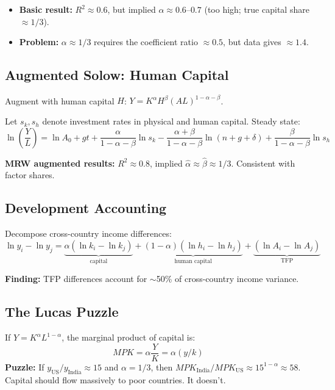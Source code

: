 \documentclass[a4paper,11pt]{article}
\begin{document}
\begin{itemize}
    \item \textbf{Basic result:} $R^2 \approx 0.6$, but implied $\alpha \approx 0.6$--$0.7$ (too high; true capital share $\approx 1/3$).
    \item \textbf{Problem:} $\alpha \approx 1/3$ requires the coefficient ratio $\approx 0.5$, but data gives $\approx 1.4$.
\end{itemize}

\subsection*{Augmented Solow: Human Capital}

Augment with human capital $H$: $Y = K^\alpha H^\beta (AL)^{1-\alpha-\beta}$.

Let $s_k, s_h$ denote investment rates in physical and human capital. Steady state:
\[
\ln\!\left(\frac{Y}{L}\right) = \ln A_0 + gt + \frac{\alpha}{1-\alpha-\beta}\ln s_k - \frac{\alpha+\beta}{1-\alpha-\beta}\ln(n+g+\delta) + \frac{\beta}{1-\alpha-\beta}\ln s_h
\]

\begin{resultbox}
\textbf{MRW augmented results:} $R^2 \approx 0.8$, implied $\hat{\alpha} \approx \hat{\beta} \approx 1/3$. Consistent with factor shares.
\end{resultbox}

\subsection*{Development Accounting}

Decompose cross-country income differences:
\[
\ln y_i - \ln y_j = \underbrace{\alpha(\ln k_i - \ln k_j)}_{\text{capital}} + \underbrace{(1-\alpha)(\ln h_i - \ln h_j)}_{\text{human capital}} + \underbrace{(\ln A_i - \ln A_j)}_{\text{TFP}}
\]

\textbf{Finding:} TFP differences account for $\sim$50\% of cross-country income variance.

\subsection*{The Lucas Puzzle}

If $Y = K^\alpha L^{1-\alpha}$, the marginal product of capital is:
\[
MPK = \alpha \frac{Y}{K} = \alpha (y/k)
\]
\textbf{Puzzle:} If $y_{\text{US}}/y_{\text{India}} \approx 15$ and $\alpha = 1/3$, then $MPK_{\text{India}}/MPK_{\text{US}} \approx 15^{1-\alpha} \approx 58$. Capital should flow massively to poor countries. It doesn't.
\end{document}
